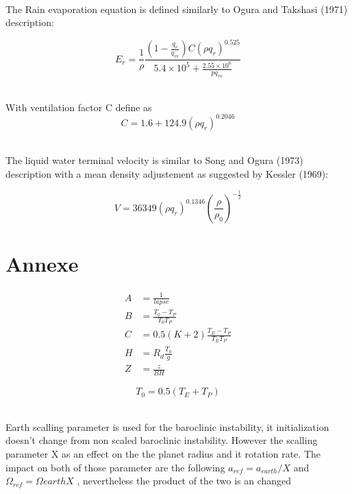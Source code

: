 \documentclass{article}
\begin{document}
~\\ The Rain evaporation equation is defined similarly to Ogura and Takshasi (1971) description:

\begin{equation}
E_r=\frac{1}{\rho}\frac{\left(1-\frac{q_v}{q_{vs}}\right)C(\rho q_r)^{0.525}}{5.4\times10^5+\frac{2.55\times10^6}{pq_{vs}}}
\end{equation}



~\\ With ventilation factor C define as 
\begin{equation}
C=1.6+124.9(\rho q_r)^{0.2046}
\label{venti}
\end{equation}



~\\ The liquid water terminal velocity is similar to Song and Ogura (1973) description with a mean density adjustement as suggested by Kessler (1969):

\begin{equation}
V=36349(\rho q_r)^{0.1346}\left(\frac{\rho}{\rho_0}\right)^{-\frac{1}{2}}
\end{equation}



\clearpage 
\appendix
\section{Annexe}

\begin{align*}
A&= \frac{1}{lapse} \\
B&=\frac{T_0-T_P}{T_0T_P} \\
C&=0.5(K+2) \frac{T_E-T_P}{T_ET_P} \\
H&=R_d\frac{T_0} {g}\\
Z&=\frac{z}{B H}  
\end{align*}


\begin{equation*}
T_0=0.5(T_E +T_P)
\end{equation*}

~\\Earth scalling parameter is used for the baroclinic instability, it initialization doesn't change from non scaled baroclinic instability. However the scalling parameter X as an effect on the the planet radius and it rotation rate. The impact on both of those parameter are the following $a_{ref}=a_{earth}/X$ and $\Omega_{ref}=\Omega{earth}X$ , nevertheless the product of the two is an changed 
\end{document}
